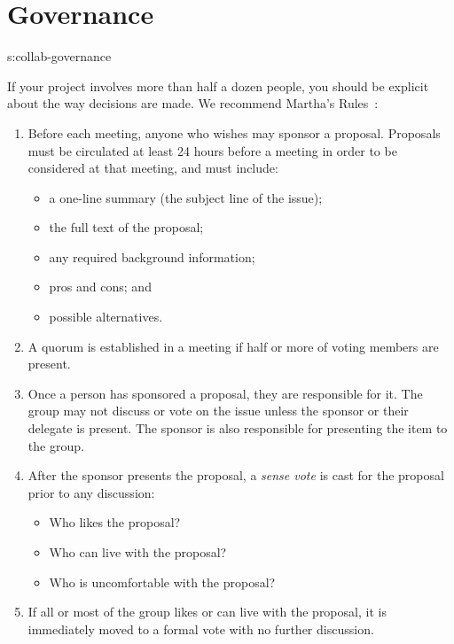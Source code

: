 \section{Governance}{s:collab-governance}

If your project involves more than half a dozen people,
you should be explicit about the way decisions are made.
We recommend Martha's Rules~\cite{Mina1986}:

\begin{enumerate}

\item
  Before each meeting, anyone who wishes may sponsor a proposal.  Proposals must
  be circulated at least 24 hours before a meeting in order to be considered at
  that meeting, and must include:

  \begin{itemize}
  \item a one-line summary (the subject line of the issue);
  \item the full text of the proposal;
  \item any required background information;
  \item pros and cons; and
  \item possible alternatives.
  \end{itemize}

\item
  A quorum is established in a meeting if half or more of voting members are
  present.

\item
  Once a person has sponsored a proposal, they are responsible for it.  The
  group may not discuss or vote on the issue unless the sponsor or their
  delegate is present.  The sponsor is also responsible for presenting the item
  to the group.

\item
  After the sponsor presents the proposal, a \emph{sense vote} is cast for the
  proposal prior to any discussion:

  \begin{itemize}
  \item Who likes the proposal?
  \item Who can live with the proposal?
  \item Who is uncomfortable with the proposal?
  \end{itemize}

\item
  If all or most of the group likes or can live with the proposal, it is
  immediately moved to a formal vote with no further discussion.


\end{enumerate}
